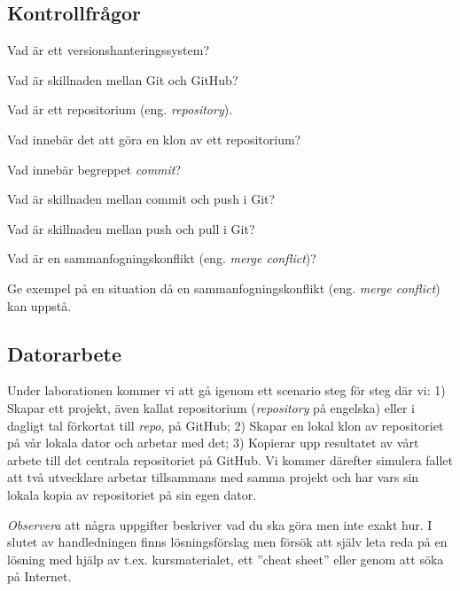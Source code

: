 \subsection*{Kontrollfrågor}
\begin{Kontrollfragor}
	\item Vad är ett versionshanteringssystem?
	\item Vad är skillnaden mellan Git och GitHub?
	\item Vad är ett repositorium (eng. \emph{repository}).
	\item Vad innebär det att göra en klon av ett repositorium?
	\item Vad innebär begreppet \emph{commit}?
	\item Vad är skillnaden mellan commit och push i Git?
	\item Vad är skillnaden mellan push och pull i Git?
	\item Vad är en sammanfogningskonflikt (eng. \emph{merge conflict})?
	\item Ge exempel på en situation då en sammanfogningskonflikt (eng. \emph{merge conflict}) kan uppstå.
\end{Kontrollfragor}

\clearpage
\subsection*{Datorarbete}
Under laborationen kommer vi att gå igenom ett scenario steg för steg där vi: 1) Skapar ett projekt, även kallat repositorium (\emph{repository} på engelska) eller i dagligt tal förkortat till  \emph{repo}, på GitHub; 2) Skapar en lokal klon av repositoriet på vår lokala dator och arbetar med det; 3) Kopierar upp resultatet av vårt arbete till det centrala repositoriet på GitHub. Vi kommer därefter simulera fallet att två utvecklare arbetar tillsammans med samma projekt och har vars sin lokala kopia av repositoriet på sin egen dator.

\emph{Observera} att några uppgifter beskriver vad du ska göra men inte exakt hur. I slutet av handledningen finns lösningsförslag men försök att själv leta reda på en lösning med hjälp av t.ex. kursmaterialet, ett ''cheat sheet'' eller genom att söka på Internet.


